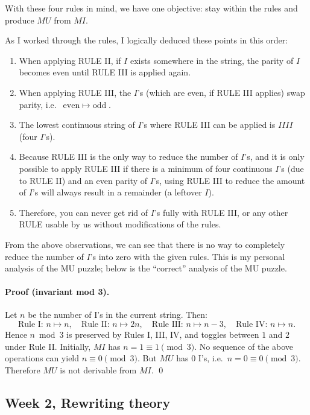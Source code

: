 \documentclass{article}
\theoremstyle{theorem}
\theoremstyle{definition}
\theoremstyle{remark}
\begin{document}
With these four rules in mind, we have one objective: stay within the rules and produce $MU$ from $MI$.

As I worked through the rules, I logically deduced these points in this order:
\begin{enumerate}
    \item When applying RULE II, if $I$ exists somewhere in the string, the parity of $I$ becomes even until RULE III is applied again.
    \item When applying RULE III, the $I$'s (which are even, if RULE III applies) swap parity, i.e.\ $\text{even} \;\mapsto\; \text{odd}$.
    \item The lowest continuous string of $I$'s where RULE III can be applied is $IIII$ (four $I$'s).
    \item Because RULE III is the only way to reduce the number of $I$'s, and it is only possible to apply RULE III if there is a minimum of four continuous $I$'s (due to RULE II) and an even parity of $I$'s, using RULE III to reduce the amount of $I$'s will always result in a remainder (a leftover $I$).
    \item Therefore, you can never get rid of $I$'s fully with RULE III, or any other RULE usable by us without modifications of the rules.
\end{enumerate}

From the above observations, we can see that there is no way to completely reduce the number of $I$'s into zero with the given rules. This is my personal analysis of the MU puzzle; below is the ``correct'' analysis of the MU puzzle.


\paragraph{Proof (invariant mod 3).}
Let $n$ be the number of I’s in the current string. Then:
\[
\text{Rule I: } n\mapsto n,\quad
\text{Rule II: } n\mapsto 2n,\quad
\text{Rule III: } n\mapsto n-3,\quad
\text{Rule IV: } n\mapsto n.
\]
Hence $n\bmod 3$ is preserved by Rules I, III, IV, and toggles between $1$ and $2$ under Rule II.
Initially, $MI$ has $n=1\equiv 1\pmod 3$. No sequence of the above operations can yield $n\equiv 0\pmod 3$.
But $MU$ has $0$ I’s, i.e.\ $n=0\equiv 0\pmod 3$. Therefore $MU$ is not derivable from $MI$.
\qed

\subsection{Week 2, Rewriting theory}
\end{document}
